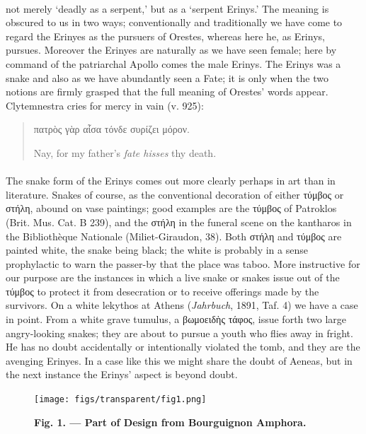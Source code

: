 \documentclass[a4paper, 11pt, oneside, polutonikogreek, english]{article}
\begin{document}
\paragraph{}
not merely `deadly as a serpent,' but as a `serpent Erinys.' The meaning is obscured to us in two ways; conventionally and traditionally we have come to regard the Erinyes as the pursuers of Orestes, whereas here he, as Erinys, pursues. Moreover the Erinyes are naturally as we have seen female; here by command of the patriarchal Apollo comes the male Erinys. The Erinys was a snake and also as we have abundantly seen a Fate; it is only when the two notions are firmly grasped that the full meaning of Orestes' words appear. Clytemnestra cries for mercy in vain (v. 925):
\begin{quotation}
\large
πατρὸς γὰρ αἶσα τόνδε συρίζει μόρον.

Nay, for my father's \emph{fate hisses} thy death.
\end{quotation}
\paragraph{}
The snake form of the Erinys comes out more clearly perhaps in art than in literature. Snakes of course, as the conventional decoration of either τύμβος or στήλη, abound on vase paintings; good examples are the τύμβος of Patroklos (Brit. Mus. Cat. B 239), and the στήλη in the funeral scene on the kantharos in the Bibliothèque Nationale (Miliet-Giraudon, 38). Both στήλη and τύμβος are painted white, the snake being black; the white is probably in a sense prophylactic to warn the passer-by that the place was taboo. More instructive for our purpose are the instances in which a live snake or snakes issue out of the τύμβος to protect it from desecration or to receive offerings made by the survivors. On a white lekythos at Athens (\emph{Jahrbuch}, 1891, Taf. 4) we have a case in point. From a white grave tumulus, a βωμοειδὴς τάφος, issue forth two large angry-looking snakes; they are about to pursue a youth who flies away in fright. He has no doubt accidentally or intentionally violated the tomb, and they are the avenging Erinyes. In a case like this we might share the doubt of Aeneas, but in the next instance the Erinys' aspect is beyond doubt.
\begin{figure}[H]
\centering
\texttt{[image: figs/transparent/fig1.png]}
\caption{\bfseries Fig. 1. --- Part of Design from Bourguignon Amphora.}
\end{figure}
\end{document}
